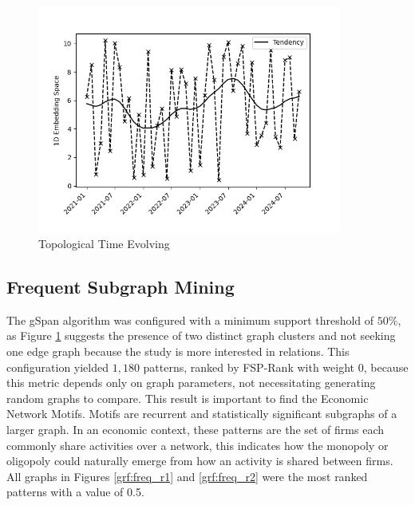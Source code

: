 \documentclass[12pt]{article}
\begin{document}
\begin{figure}[H]
\includegraphics[width=10cm]{time_struct.png}
\centering
 \caption{Topological Time Evolving}
    \label{fig:tp}
\end{figure}

\subsection{Frequent Subgraph Mining}

The gSpan algorithm was configured with a minimum support threshold of $50\%$, as Figure \ref{fig:tp} suggests the presence of two distinct graph clusters and not seeking one edge graph because the study is more interested in relations. This configuration yielded $1,180$ patterns, ranked by FSP-Rank \cite{ur2021graph} with weight 0, because this metric depends only on graph parameters, not necessitating generating random graphs to compare. This result is important to find the Economic Network Motifs. Motifs are recurrent and statistically significant subgraphs of a larger graph. In an economic context, these patterns are the set of firms each commonly share activities over a network, this indicates how the monopoly or oligopoly could naturally emerge from how an activity is shared between firms. All graphs in Figures \ref{grf:freq_r1} and \ref{grf:freq_r2} were the most ranked patterns with a value of 0.5.
\end{document}
